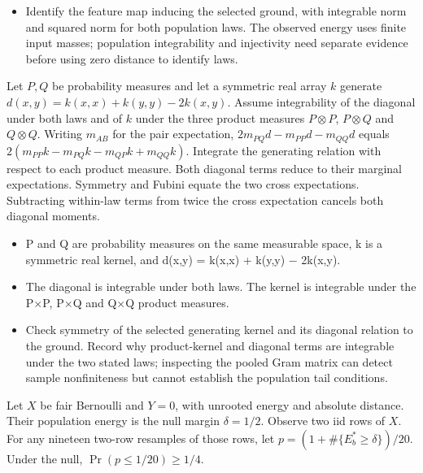 \expandafter\def\csname statadic@diagnostics@STATADIC-ENERGY-004\endcsname{\begin{itemize}
\item Identify the feature map inducing the selected ground, with integrable norm and squared norm for both population laws. The observed energy uses finite input masses; population integrability and injectivity need separate evidence before using zero distance to identify laws.
\end{itemize}}
\expandafter\def\csname statadic@statement@STATADIC-ENERGY-005\endcsname{Let $P,Q$ be probability measures and let a symmetric real
  array $k$ generate $d(x,y)=k(x,x)+k(y,y)-2k(x,y)$. Assume integrability of
  the diagonal under both laws and of $k$ under the three product measures
  $P\otimes P$, $P\otimes Q$ and $Q\otimes Q$. Writing $m_{AB}$ for the pair
  expectation, $2m_{PQ}d-m_{PP}d-m_{QQ}d$ equals
  $2(m_{PP}k-m_{PQ}k-m_{QP}k+m_{QQ}k)$.}
\expandafter\def\csname statadic@proof@STATADIC-ENERGY-005\endcsname{Integrate the generating relation with respect to each product
  measure. Both diagonal terms reduce to their marginal expectations. Symmetry
  and Fubini equate the two cross expectations. Subtracting within-law terms
  from twice the cross expectation cancels both diagonal moments.}
\expandafter\def\csname statadic@assumptions@STATADIC-ENERGY-005\endcsname{\begin{itemize}
\item P and Q are probability measures on the same measurable space, k is a symmetric real kernel, and d(x,y) = k(x,x) + k(y,y) \ensuremath{-} 2k(x,y).
\item The diagonal is integrable under both laws. The kernel is integrable under the P\ensuremath{\times}P, P\ensuremath{\times}Q and Q\ensuremath{\times}Q product measures.
\end{itemize}}
\expandafter\def\csname statadic@diagnostics@STATADIC-ENERGY-005\endcsname{\begin{itemize}
\item Check symmetry of the selected generating kernel and its diagonal relation to the ground. Record why product-kernel and diagonal terms are integrable under the two stated laws; inspecting the pooled Gram matrix can detect sample nonfiniteness but cannot establish the population tail conditions.
\end{itemize}}
\expandafter\def\csname statadic@statement@STATADIC-EQUIVALENCE-001\endcsname{Let $X$ be fair Bernoulli and $Y=0$, with unrooted energy
  and absolute distance. Their population energy is the null margin $\delta=1/2$.
  Observe two iid rows of $X$. For any nineteen two-row resamples of those rows,
  let $p=(1+\#\{E_b^*\ge\delta\})/20$. Under the null,
  $\Pr(p\le 1/20)\ge1/4$.}

